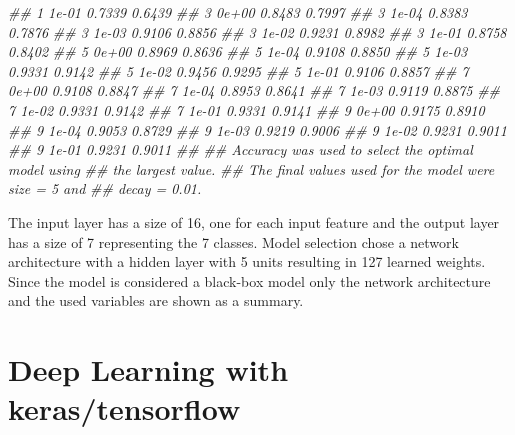 \documentclass[
  notitlepage]{book}
\newenvironment{Shaded}{\begin{snugshade}}{\end{snugshade}}
\newcommand{\CommentTok}[1]{\textcolor[rgb]{0.56,0.35,0.01}{\textit{#1}}}
\newcommand{\NormalTok}[1]{#1}
\newcommand{\OperatorTok}[1]{\textcolor[rgb]{0.81,0.36,0.00}{\textbf{#1}}}
\begin{document}
\begin{Shaded}
\begin{Highlighting}[]
\CommentTok{\#\#   1     1e{-}01  0.7339    0.6439}
\CommentTok{\#\#   3     0e+00  0.8483    0.7997}
\CommentTok{\#\#   3     1e{-}04  0.8383    0.7876}
\CommentTok{\#\#   3     1e{-}03  0.9106    0.8856}
\CommentTok{\#\#   3     1e{-}02  0.9231    0.8982}
\CommentTok{\#\#   3     1e{-}01  0.8758    0.8402}
\CommentTok{\#\#   5     0e+00  0.8969    0.8636}
\CommentTok{\#\#   5     1e{-}04  0.9108    0.8850}
\CommentTok{\#\#   5     1e{-}03  0.9331    0.9142}
\CommentTok{\#\#   5     1e{-}02  0.9456    0.9295}
\CommentTok{\#\#   5     1e{-}01  0.9106    0.8857}
\CommentTok{\#\#   7     0e+00  0.9108    0.8847}
\CommentTok{\#\#   7     1e{-}04  0.8953    0.8641}
\CommentTok{\#\#   7     1e{-}03  0.9119    0.8875}
\CommentTok{\#\#   7     1e{-}02  0.9331    0.9142}
\CommentTok{\#\#   7     1e{-}01  0.9331    0.9141}
\CommentTok{\#\#   9     0e+00  0.9175    0.8910}
\CommentTok{\#\#   9     1e{-}04  0.9053    0.8729}
\CommentTok{\#\#   9     1e{-}03  0.9219    0.9006}
\CommentTok{\#\#   9     1e{-}02  0.9231    0.9011}
\CommentTok{\#\#   9     1e{-}01  0.9231    0.9011}
\CommentTok{\#\# }
\CommentTok{\#\# Accuracy was used to select the optimal model using}
\CommentTok{\#\#  the largest value.}
\CommentTok{\#\# The final values used for the model were size = 5 and}
\CommentTok{\#\#  decay = 0.01.}
\end{Highlighting}
\end{Shaded}

The input layer has a size of 16, one for each input feature and
the output layer has a size of 7 representing the 7 classes.
Model selection chose a network architecture with a hidden
layer with 5 units
resulting in 127 learned weights.
Since the model is considered a black-box model only the network architecture
and the used variables are shown as a summary.

\begin{Shaded}
\end{Shaded}

\hypertarget{deep-learning-with-kerastensorflow}{%
\section{Deep Learning with keras/tensorflow}\label{deep-learning-with-kerastensorflow}}
\end{document}
